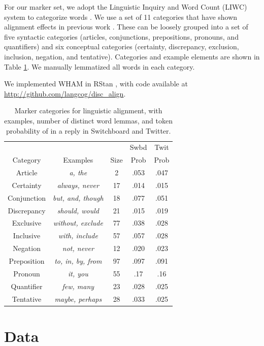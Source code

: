 \documentclass[11pt]{article}
\begin{document}
For our marker set, we adopt the Linguistic Inquiry and Word Count (LIWC) system to categorize words \cite{LIWC}.  We use a set of 11 categories that have shown alignment effects in previous work \cite{DNMGamonDumais2011}. These can be loosely grouped into a set of five syntactic categories (articles, conjunctions, prepositions, pronouns, and quantifiers) and six conceptual categories (certainty, discrepancy, exclusion, inclusion, negation, and tentative). Categories and example elements are shown in Table \ref{table:liwc}. We manually lemmatized all words in each category.

We implemented WHAM in RStan \cite{Stan}, with code available at \url{http://github.com/langcog/disc_align}.

\begin{table}
\centering
\small
\begin{tabular}{|c|c|c|c|c|} \hline
& & & Swbd & Twit \\
Category & Examples & Size & Prob & Prob\\ \hline
Article & \textit{a, the} & 2 & .053 & .047\\
Certainty  & \textit{always, never} & 17 & .014 & .015\\
Conjunction  & \textit{but, and, though} & 18 & .077 & .051\\
Discrepancy  & \textit{should, would} & 21 & .015 & .019\\
Exclusive  & \textit{without, exclude} & 77 & .038 & .028\\
Inclusive  & \textit{with, include} & 57 & .057 & .028\\
Negation  & \textit{not, never} & 12 & .020 & .023\\
Preposition  & \textit{to, in, by, from} & 97 & .097 & .091\\
Pronoun   & \textit{it, you} & 55 & .17 & .16\\
Quantifier  & \textit{few, many} & 23 & .028 & .025\\
Tentative & \textit{maybe, perhaps} & 28 & .033 & .025\\
\hline\end{tabular}
\caption{Marker categories for linguistic alignment, with examples, number of distinct word lemmas, and token probability of in a reply in Switchboard and Twitter.}\label{table:liwc}
\end{table}

\section{Data}
\end{document}
